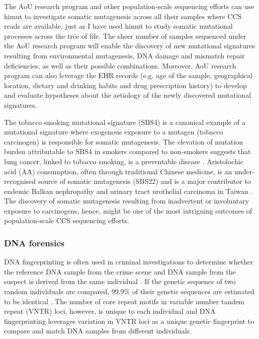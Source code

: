 The AoU research program and other population-scale sequencing efforts can use himut to investigate somatic mutagenesis across all their samples where CCS reads are available, just as I have used himut to study somatic mutational processes across the tree of life. The sheer number of samples sequenced under the AoU research program will enable the discovery of new mutational signatures resulting from environmental mutagenesis, DNA damage and mismatch repair deficiencies, as well as their possible combinations. Moreover, AoU research program can also leverage the EHR records (e.g. age of the sample, geographical location, dietary and drinking habits and drug prescription history) to develop and evaluate hypotheses about the aetiology of the newly discovered mutational signatures.
 
The tobacco smoking mutational signature (SBS4) is a canonical example of a mutational signature where exogenous exposure to a mutagen (tobacco carcinogen) is responsible for somatic mutagenesis. The elevation of mutation burden attributable to SBS4 in smokers compared to non-smokers suggests that lung cancer, linked to tobacco smoking, is a preventable disease \cite{}. Aristolochic acid (AA) consumption, often through traditional Chinese medicine, is an under-recognised source of somatic mutagenesis (SBS22) and is a major contributor to endemic Balkan nephropathy \cite{} and urinary tract urothelial carcinoma in Taiwan \cite{}. The discovery of somatic mutagenesis resulting from inadvertent or involuntary exposure to carcinogens, hence, might be one of the most intriguing outcomes of population-scale CCS sequencing efforts. 
 
\subsubsection{DNA forensics}

DNA fingerprinting is often used in criminal investigations to determine whether the reference DNA sample from the crime scene and DNA sample from the suspect is derived from the same individual \cite{}. If the genetic sequence of two random individuals are compared, 99.9\% of their genetic sequences are estimated to be identical \cite{}. The number of core repeat motifs in variable number tandem repeat (VNTR) loci, however, is unique to each individual and DNA fingerprinting leverages variation in VNTR loci as a unique genetic fingerprint to compare and match DNA samples from different individuals. 

